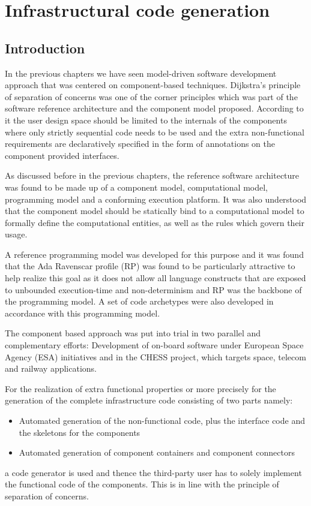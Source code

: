 
\chapter{Infrastructural code generation}
\label{chap: Code generation}

\section{Introduction}
In the previous chapters we have seen model-driven software development approach that was centered on component-based techniques. Dijkstra's principle of separation of concerns was one of the corner principles which was part of the software reference architecture and the component model proposed. According to it the user design space should be limited to the internals of the components where only strictly sequential code needs to be used and the extra non-functional requirements are declaratively specified in the form of annotations on the component provided interfaces. 

As discussed before in the previous chapters, the reference software architecture was found to be made up of a component model, computational model, programming model and a conforming execution platform. It was also understood that the component model should be statically bind to a computational model to formally define the computational entities, as well as the rules which govern their usage.

A reference programming model was developed for this purpose and it was found that the Ada Ravenscar profile (RP) was found to be particularly attractive to help realize this goal as it does not allow all language constructs that are exposed to unbounded execution-time and non-determinism and RP was the backbone of the programming model. A set of code archetypes were also developed in accordance with this programming model.

The component based approach was put into trial in two parallel and complementary efforts: Development of on-board software under European Space Agency (ESA) initiatives and in the CHESS project, which targets space, telecom and railway applications.

For the realization of extra functional properties or more precisely for the generation of the complete infrastructure code consisting of two parts namely:
\begin{itemize}
\item Automated generation of the non-functional code, plus the interface code and the skeletons for the components
\item Automated generation of component containers and component connectors 
\end{itemize}
a code generator is used and thence the third-party user has to solely implement the functional code of the components. This is in line with the principle of separation of concerns.

